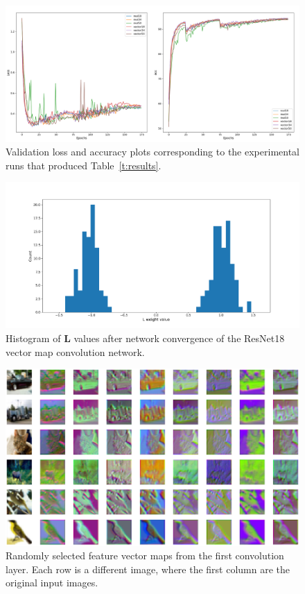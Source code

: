 \documentclass[14pt,a4paper]{article}
\begin{document}
\begin{figure}[h]
	\centering
		\includegraphics[width=1.0\columnwidth]{figures/loss.png}
		\caption{Validation loss and accuracy plots corresponding to the experimental runs that produced Table~\ref{t:results}.}
	\label{f:loss}
\end{figure}

\begin{figure}[h]
	\centering
		\includegraphics[width=1.0\columnwidth]{figures/hist.png}
		\caption{Histogram of $\textbf{L}$ values after network convergence of the ResNet18 vector map convolution network.}
	\label{f:hist}
\end{figure}

\begin{figure}[h]
	\centering
		\includegraphics[width=1.0\columnwidth]{figures/samples.png}
		\caption{Randomly selected feature vector maps from the first convolution layer. Each row is a different image, where the first column are the original input images.}
	\label{f:samples}
\end{figure}
\end{document}
